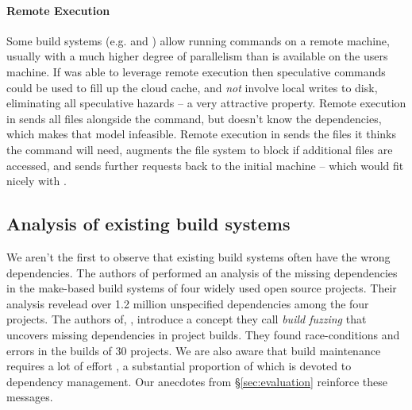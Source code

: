 \paragraph{Remote Execution} Some build systems (e.g. \Bazel and \BuildXL \cite{buildxl}) allow running commands on a remote machine, usually with a much higher degree of parallelism than is available on the users machine. If \Rattle was able to leverage remote execution then speculative commands could be used to fill up the cloud cache, and \emph{not} involve local writes to disk, eliminating all speculative hazards -- a very attractive property. Remote execution in \Bazel sends all files alongside the command, but \Rattle doesn't know the dependencies, which makes that model infeasible. Remote execution in \BuildXL sends the files it thinks the command will need, augments the file system to block if additional files are accessed, and sends further requests back to the initial machine -- which would fit nicely with \Rattle.

\subsection{Analysis of existing build systems}

We aren't the first to observe that existing build systems often have the wrong dependencies.  The authors of \cite{bezemer2017empirical} performed an analysis of the missing dependencies in the make-based build systems of four widely used open source projects.  Their analysis revelead over 1.2 million unspecified dependencies among the four projects.  The authors of, \cite{detecting_incorrect_build_rules}, introduce a concept they call \emph{build fuzzing} that uncovers missing dependencies in project builds.  They found race-conditions and errors in the builds of 30 projects. We are also aware that build maintenance requires a lot of effort \cite{build_maintenance}, a substantial proportion of which is devoted to dependency management. Our anecdotes from \S\ref{sec:evaluation} reinforce these messages.

\begin{comment}
\subsection{Other related work}

The notion of hazards is used extensively in processor design. This is standard terminology.
\end{comment}
